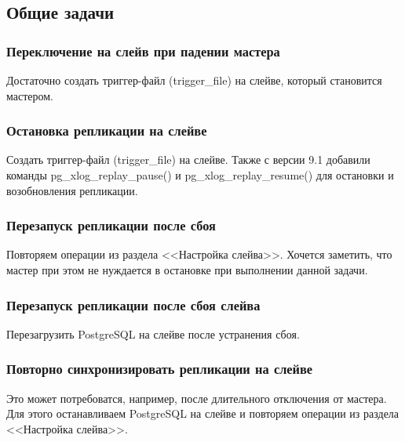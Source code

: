 \subsection{Общие задачи}
\subsubsection{Переключение на слейв при падении мастера}
Достаточно создать триггер-файл (trigger\_file) на слейве, который становится мастером.

\subsubsection{Остановка репликации на слейве}
Создать триггер-файл (trigger\_file) на слейве. Также с версии 9.1 добавили команды pg\_xlog\_replay\_pause() и pg\_xlog\_replay\_resume() для остановки и возобновления репликации.

\subsubsection{Перезапуск репликации после сбоя}
Повторяем операции из раздела <<Настройка слейва>>. Хочется заметить, что мастер при этом не нуждается в остановке при выполнении данной задачи.

\subsubsection{Перезапуск репликации после сбоя слейва}
Перезагрузить PostgreSQL на слейве после устранения сбоя.

\subsubsection{Повторно синхронизировать репликации на слейве}
Это может потребоватся, например, после длительного отключения от мастера. 
Для этого останавливаем PostgreSQL на слейве и повторяем операции из раздела <<Настройка слейва>>.